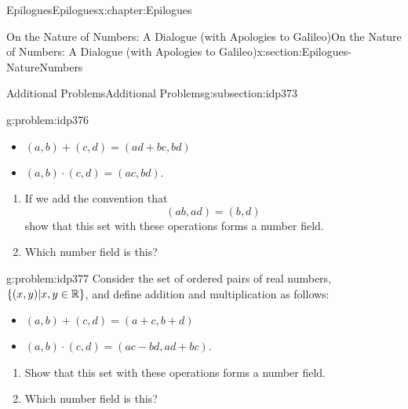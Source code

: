 \begin{chapterptx}{Epilogues}{}{Epilogues}{}{}{x:chapter:Epilogues}
\begin{sectionptx}{On the Nature of Numbers: A Dialogue (with Apologies to Galileo)}{}{On the Nature of Numbers: A Dialogue (with Apologies to Galileo)}{}{}{x:section:Epilogues-NatureNumbers}
\begin{subsectionptx}{Additional Problems}{}{Additional Problems}{}{}{g:subsection:idp373}
\begin{problem}{}{g:problem:idp376}
				\par
				\begin{itemize}[label=\textbullet]
					\item{}\par%
					\(\displaystyle (a,b)+(c,d) = (ad+bc, bd)\)%
					\item{}\par%
					\((a,b)\cdot(c,d) = (ac, bd)\).%
				\end{itemize}
				\begin{enumerate}[font=\bfseries,label=(\alph*),ref=\alph*]
					\item{}If we add the convention that%
					\begin{equation*}
						(ab, ad) = (b,d)
					\end{equation*}
					show that this set with these operations forms a number field.%
					\item{}Which number field is this?%
				\end{enumerate}
			\end{problem}
			\begin{problem}{}{g:problem:idp377}%
				Consider the set of ordered pairs of real numbers, \(\left\{(x,y)|x, y\in\mathbb {R}\right\}\), and define addition and multiplication as follows:%
				\par
				\begin{itemize}[label=\textbullet]
					\item{}\par%
					\(\displaystyle (a,b)+(c,d) = (a+c, b+d)\)%
					\item{}\par%
					\((a,b)\cdot(c,d) = (ac- bd,ad+bc)\).%
				\end{itemize}
				\begin{enumerate}[font=\bfseries,label=(\alph*),ref=\alph*]
					\item{}Show that this set with these operations forms a number field.%
					\item{}Which number field is this?%
				\end{enumerate}
			\end{problem}
		\end{subsectionptx}
	\end{sectionptx}
	\typeout{************************************************}
	\typeout{************************************************}

\end{chapterptx}
